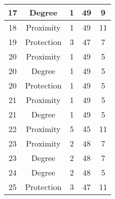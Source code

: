 \documentclass[results.tex]{subfiles}
\begin{document}
\begin{center}
\begin{tabular}{| c || c | c | c | c |}
            \hline
            17                      & Degree                       & 1                      & 49                      & 9                    \\
            \hline
            18                      & Proximity                    & 1                      & 49                      & 11                   \\
            \hline
            19                      & Protection                   & 3                      & 47                      & 7                    \\
            \hline
            20                      & Proximity                    & 1                      & 49                      & 5                    \\
            \hline
            20                      & Degree                       & 1                      & 49                      & 5                    \\
            \hline
            20                      & Protection                   & 1                      & 49                      & 5                    \\
            \hline
            21                      & Proximity                    & 1                      & 49                      & 5                    \\
            \hline
            21                      & Degree                       & 1                      & 49                      & 5                    \\
            \hline
            22                      & Proximity                    & 5                      & 45                      & 11                   \\
            \hline
            23                      & Proximity                    & 2                      & 48                      & 7                    \\
            \hline
            23                      & Degree                       & 2                      & 48                      & 7                    \\
            \hline
            24                      & Degree                       & 2                      & 48                      & 5                    \\
            \hline
            25                      & Protection                   & 3                      & 47                      & 11                   \\

\end{tabular}
\end{center}
\end{document}
